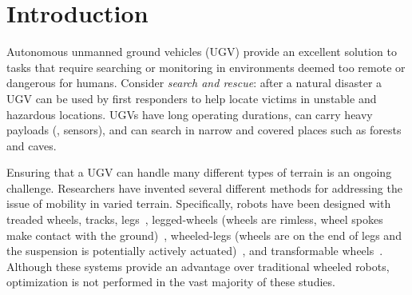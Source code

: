 

\section{Introduction}


Autonomous unmanned ground vehicles (UGV) provide an excellent solution to tasks that require searching or monitoring in environments deemed too remote or dangerous for humans.
%
Consider \emph{search and rescue}: after a natural disaster a UGV can be used by first responders to help locate victims in unstable and hazardous locations.
%
UGVs have long operating durations, can carry heavy payloads (\eg{}, sensors), and can search in narrow and covered places such as forests and caves.
%
%


Ensuring that a UGV can handle many different types of terrain is an ongoing challenge.
%
Researchers have invented several different methods for addressing the issue of mobility in varied terrain.
%
Specifically, robots have been designed with
treaded wheels,
tracks,
legs~\citep{Haldane.ICRA.VelociRoACH.2013},
legged-wheels (wheels are rimless, wheel spokes make contact with the ground)~\citep{Saranli.IntJrnRoboRes.RHex.2001,Quinn.IROS.Whegs.2002,Eich.SSRR.Stair-climb-SAR.2008,Kenneally.IEEERobAutLetters.Legged-robots.2016},
wheeled-legs (wheels are on the end of legs and the suspension is potentially actively actuated)~\citep{Grand.2004.IJRR.StabilityTractionOptimization,Zheng.2015.AME.DesignAnalysisWheellegged,Smith.IROS.Tri-wheel.2015}, and
transformable wheels~\citep{Kim.2014.ITR.WheelTransformerWheelLeg,Chen.2014.ITM.QuattropedLegWheel,Chen.2017.ITR.TurboQuadNovelLega,Wei.2017.JMR.DesignImplementationLeg}.
%
Although these systems provide an advantage over traditional wheeled robots, optimization is not performed in the vast majority of these studies.
%


